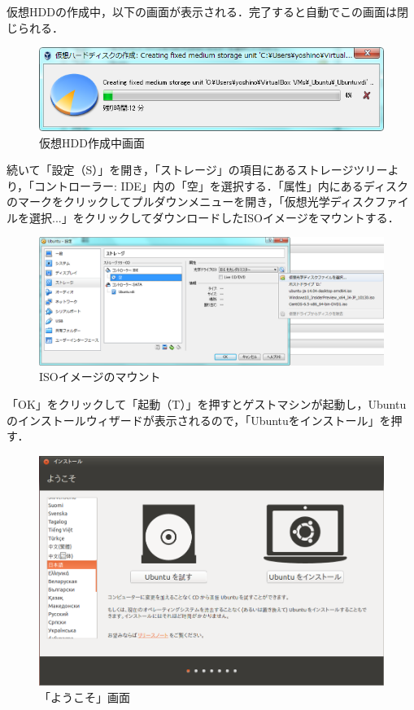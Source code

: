 仮想HDDの作成中，以下の画面が表示される．完了すると自動でこの画面は閉じられる．

\begin{figure}[H]
\centering
\includegraphics[width=13cm]{vdi_creating.PNG}
\caption{仮想HDD作成中画面}\label{vdicreating}
\end{figure}

続いて「設定（S）」を開き，「ストレージ」の項目にあるストレージツリーより，「コントローラー: IDE」内の「空」を選択する．「属性」内にあるディスクのマークをクリックしてプルダウンメニューを開き，「仮想光学ディスクファイルを選択...」をクリックしてダウンロードしたISOイメージをマウントする．
	
\begin{figure}[H]
\centering
\includegraphics[width=13cm]{iso_set.png}
\caption{ISOイメージのマウント}\label{isoset}
\end{figure}
	
「OK」をクリックして「起動（T）」を押すとゲストマシンが起動し，Ubuntuのインストールウィザードが表示されるので，「Ubuntuをインストール」を押す．
	
\begin{figure}[H]
\centering
\includegraphics[width=13cm]{ubuntuinstall01.PNG}
\caption{「ようこそ」画面}\label{ubuntuinstall01}
\end{figure}
	
